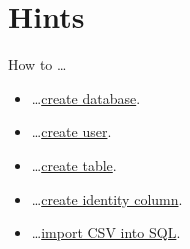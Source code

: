 \documentclass[12pt]{article}
\begin{document}
\clearpage

\section*{Hints}
How to \dots
\begin{itemize}
\item \dots \href{https://dev.mysql.com/doc/refman/5.7/en/creating-database.html}{create database}.
\item \dots \href{https://www.digitalocean.com/community/tutorials/mysql-ru}{create user}.
\item \dots \href{https://dev.mysql.com/doc/refman/5.5/en/creating-tables.html}{create table}.
\item \dots \href{https://dev.mysql.com/doc/refman/5.7/en/example-auto-increment.html}{create identity column}.
\item \dots \href{https://dev.mysql.com/doc/refman/5.7/en/load-data.html}{import CSV into SQL}.

\end{itemize}
\end{document}
